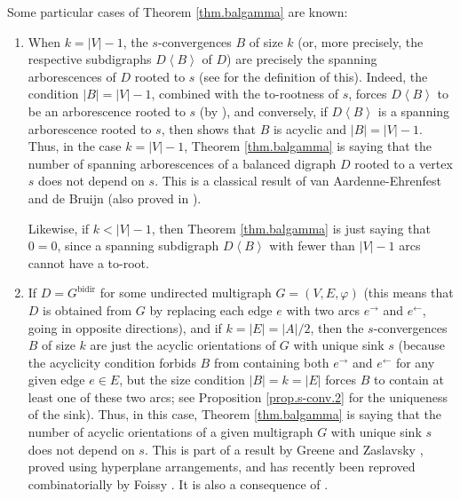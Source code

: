 \documentclass[numbers=enddot,12pt,final,onecolumn,notitlepage]{scrartcl}%
\theoremstyle{definition}
\theoremstyle{plainsl}
\begin{document}
Some particular cases of Theorem \ref{thm.balgamma} are known:

\begin{enumerate}
\item When $k=\left\vert V\right\vert -1$, the $s$-convergences $B$ of size
$k$ (or, more precisely, the respective subdigraphs $D\left\langle
B\right\rangle $ of $D$) are precisely the spanning arborescences of $D$
rooted to $s$ (see \cite[Definition 5.10.1 \textbf{(b)}]{22s} for the
definition of this). Indeed, the condition $\left\vert B\right\vert
=\left\vert V\right\vert -1$, combined with the to-rootness of $s$, forces
$D\left\langle B\right\rangle $ to be an arborescence rooted to $s$ (by
\cite[Theorem 5.10.5]{22s}), and conversely, if $D\left\langle B\right\rangle
$ is a spanning arborescence rooted to $s$, then \cite[Theorem 5.10.5]{22s}
shows that $B$ is acyclic and $\left\vert B\right\vert =\left\vert
V\right\vert -1$. Thus, in the case $k=\left\vert V\right\vert -1$, Theorem
\ref{thm.balgamma} is saying that the number of spanning arborescences of
a balanced digraph $D$ rooted to a vertex $s$ does not depend on $s$.
This is a classical result of van Aardenne-Ehrenfest and de Bruijn
\cite[Theorem 6]{AarBru51} (also proved in \cite[Corollary 5.12.1]{22s}).

Likewise, if $k<\left\vert V\right\vert -1$, then Theorem \ref{thm.balgamma}
is just saying that $0=0$, since a spanning subdigraph $D\left\langle
B\right\rangle $ with fewer than $\left\vert V\right\vert -1$ arcs cannot have
a to-root.

\item If $D=G^{\operatorname*{bidir}}$ for some undirected multigraph
$G=\left(  V,E,\varphi\right)  $ (this means that $D$ is obtained from $G$ by
replacing each edge $e$ with two arcs $e^{\rightarrow}$ and $e^{\leftarrow}$,
going in opposite directions), and if $k=\left\vert E\right\vert =\left\vert
A\right\vert /2$, then the $s$-convergences $B$ of size $k$ are just the
acyclic orientations of $G$ with unique sink $s$ (because the acyclicity
condition forbids $B$ from containing both $e^{\rightarrow}$ and
$e^{\leftarrow}$ for any given edge $e\in E$, but the size condition
$\left\vert B\right\vert =k=\left\vert E\right\vert $ forces $B$ to contain at
least one of these two arcs; see Proposition \ref{prop.s-conv.2} for the
uniqueness of the sink). Thus, in this case, Theorem \ref{thm.balgamma} is
saying that the number of acyclic orientations of a given multigraph $G$ with
unique sink $s$ does not depend on $s$. This is part of a result by Greene and
Zaslavsky \cite[Theorem 7.3]{GreZas83}, proved using hyperplane arrangements,
and has recently been reproved combinatorially by Foissy \cite[Proposition
4.6]{Foissy22}. It is also a consequence of \cite[Proposition 5.3]{NoPoSt02}.


\end{enumerate}
\end{document}
